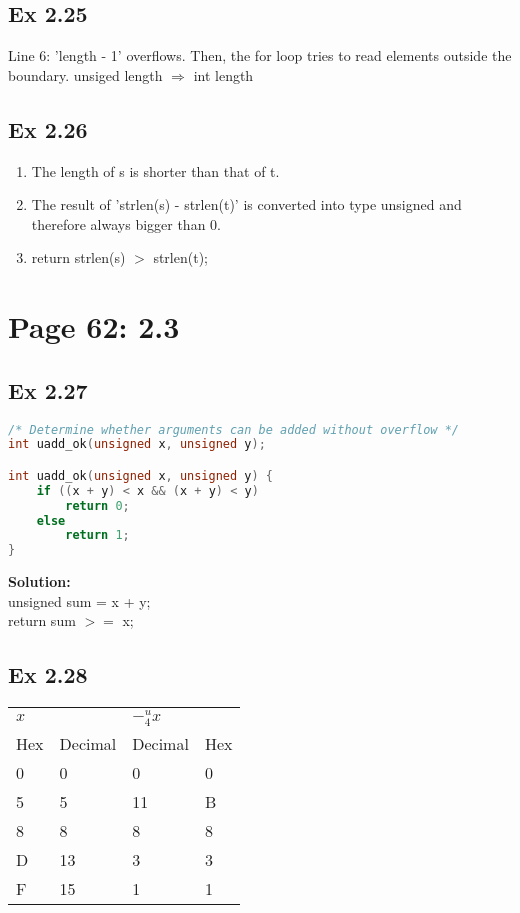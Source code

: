 \subsection{Ex 2.25}
Line 6: 'length - 1' overflows. Then, the for loop tries to read elements outside the boundary. unsiged length $\Rightarrow$ int length

\subsection{Ex 2.26}
\begin{enumerate}
    \item The length of s is shorter than that of t.
    \item The result of 'strlen(s) - strlen(t)' is converted into type unsigned and therefore always bigger than 0.
    \item return strlen(s) $>$ strlen(t);
\end{enumerate}

\section{Page 62: 2.3}
\subsection{Ex 2.27}
\begin{lstlisting}[language=C]
/* Determine whether arguments can be added without overflow */
int uadd_ok(unsigned x, unsigned y);

int uadd_ok(unsigned x, unsigned y) {
    if ((x + y) < x && (x + y) < y)
        return 0;
    else
        return 1;
}
\end{lstlisting}
{\color{blue}\textbf{Solution: } \\
    unsigned sum = x + y;\\
    return sum $>=$ x;
}

\subsection{Ex 2.28}
\begin{table}[h]
    \centering
    \begin{tabular}{llll}
        \toprule
        $x$ && $-^{u}_{4}x$ &\\
        Hex & Decimal & Decimal & Hex\\
        \midrule
        0 & 0 & 0 & 0\\
        5 & 5 & 11 & B\\
        8 & 8 & 8 & 8\\
        D & 13 & 3 & 3\\
        F & 15 & 1 & 1\\
        \bottomrule
    \end{tabular}
\end{table}

